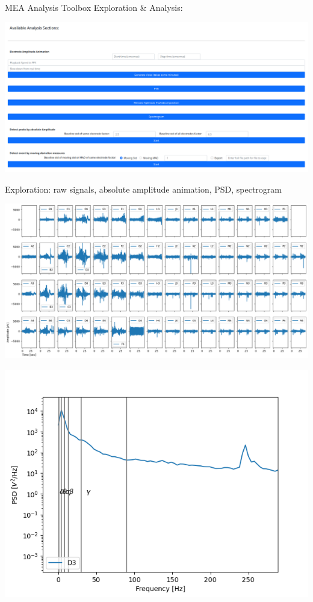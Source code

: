 \documentclass[10pt]{beamer}
\begin{document}
\begin{frame}[allowframebreaks]{MEA Analysis Toolbox}
    Exploration \& Analysis: 
      \begin{center}
      \includegraphics[keepaspectratio,width=0.8\framewidth]{img/4_analyze.png}
      \end{center}
      \framebreak
    Exploration: raw signals, absolute amplitude animation, PSD, spectrogram \\ 
      \begin{center}
        \includegraphics[keepaspectratio,width=0.9\framewidth]{img/4_raw.png}
      \end{center}
      \framebreak
      \begin{center}
        \includegraphics[keepaspectratio,width=0.8\framewidth]{img/4_psd.png}

\end{center}
\end{frame}
\end{document}
